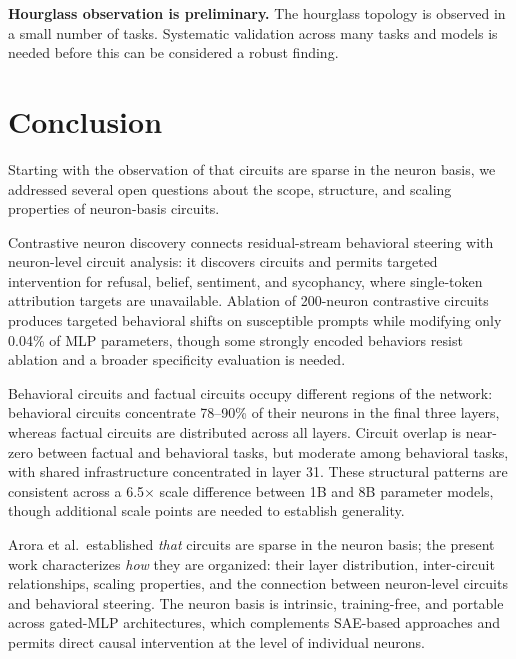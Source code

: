 \documentclass[11pt]{article}
\begin{document}
\textbf{Hourglass observation is preliminary.}
The hourglass topology is observed in a small number of tasks.
Systematic validation across many tasks and models is needed before this can be considered a robust finding.


\section{Conclusion}
\label{sec:conclusion}

Starting with the observation of \citet{arora2025circuits} that circuits are sparse in the neuron basis, we addressed several open questions about the scope, structure, and scaling properties of neuron-basis circuits.

Contrastive neuron discovery connects residual-stream behavioral steering with neuron-level circuit analysis: it discovers circuits and permits targeted intervention for refusal, belief, sentiment, and sycophancy, where single-token attribution targets are unavailable.
Ablation of 200-neuron contrastive circuits produces targeted behavioral shifts on susceptible prompts while modifying only 0.04\% of MLP parameters, though some strongly encoded behaviors resist ablation and a broader specificity evaluation is needed.

Behavioral circuits and factual circuits occupy different regions of the network: behavioral circuits concentrate 78--90\% of their neurons in the final three layers, whereas factual circuits are distributed across all layers.
Circuit overlap is near-zero between factual and behavioral tasks, but moderate among behavioral tasks, with shared infrastructure concentrated in layer 31.
These structural patterns are consistent across a 6.5$\times$ scale difference between 1B and 8B parameter models, though additional scale points are needed to establish generality.

Arora et al.\ established \emph{that} circuits are sparse in the neuron basis; the present work characterizes \emph{how} they are organized: their layer distribution, inter-circuit relationships, scaling properties, and the connection between neuron-level circuits and behavioral steering.
The neuron basis is intrinsic, training-free, and portable across gated-MLP architectures, which complements SAE-based approaches and permits direct causal intervention at the level of individual neurons.
\end{document}
